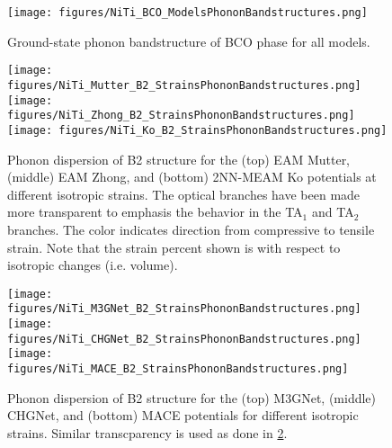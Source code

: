 \documentclass[preprint]{elsarticle}
\begin{document}
\begin{figure}[!htp]
    \begin{centering}
        \texttt{[image: figures/NiTi\_BCO\_ModelsPhononBandstructures.png]}
        \caption{
          Ground-state phonon bandstructure of BCO phase for all models.
        }
        \label{fig:allmodels_B19P}
    \end{centering}
\end{figure}

\begin{figure}[!htp]
    \begin{centering}
        \texttt{[image: figures/NiTi\_Mutter\_B2\_StrainsPhononBandstructures.png]}
        \vspace{1mm}
        \texttt{[image: figures/NiTi\_Zhong\_B2\_StrainsPhononBandstructures.png]}
        \vspace{1mm}
        \texttt{[image: figures/NiTi\_Ko\_B2\_StrainsPhononBandstructures.png]}
        \caption{
           Phonon dispersion of B2 structure for the  (top) EAM Mutter, (middle) EAM Zhong, and (bottom) 2NN-MEAM Ko potentials at different isotropic strains. The optical branches have been made more transparent to emphasis the behavior in the TA$_1$ and TA$_2$ branches. The color indicates direction from compressive to tensile strain. Note that the strain percent shown is with respect to isotropic changes (i.e. volume). 
        }
        \label{fig:mutter_zhong_phonon_b2}
    \end{centering}
\end{figure}



\begin{figure}[!htp]
    \begin{centering}
      \texttt{[image: figures/NiTi\_M3GNet\_B2\_StrainsPhononBandstructures.png]}
      \vspace{1mm}
      \texttt{[image: figures/NiTi\_CHGNet\_B2\_StrainsPhononBandstructures.png]}
      \vspace{1mm}
      \texttt{[image: figures/NiTi\_MACE\_B2\_StrainsPhononBandstructures.png]}
      \caption{
        Phonon dispersion of B2 structure for the (top) M3GNet, (middle) CHGNet, and (bottom) MACE potentials for different isotropic strains. Similar transcparency is used as done in \ref{fig:mutter_zhong_phonon_b2}.
      }
      \label{fig:gnn_phonon_b2}
    \end{centering}
\end{figure}
\end{document}
